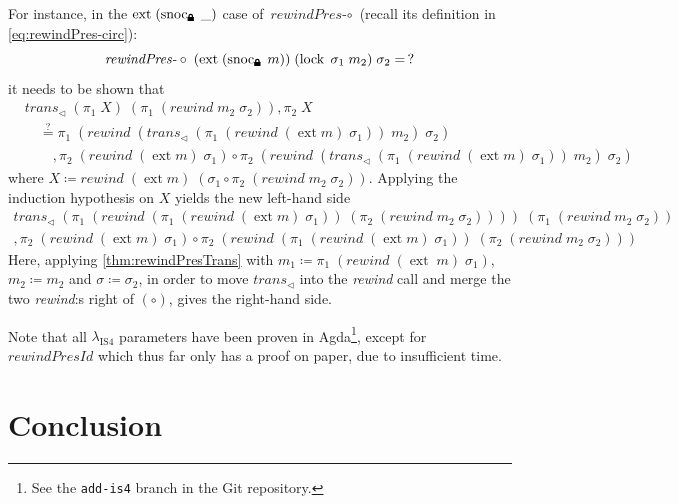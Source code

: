 \documentclass[12pt,twoside,openright]{report}
\numberwithin{equation}{chapter}
\numberwithin{figure}{chapter}
\numberwithin{table}{chapter}
\theoremstyle{definition}\newtheorem{definition}{Definition}
\newcommand{\lock}{\text{\tikz[baseline]{
      \fill[rounded corners=.1ex] (-.75ex,0) rectangle (.75ex,1ex);
      \draw[line width=.3ex] (-.4ex,.5ex) -- ++(0,.75ex) arc (180:0:.4ex) -- ++(0,-.75ex);
}}}
\begin{document}
For instance, in the $\operatorname{ext} \; (\operatorname{snoc}_\lock \; \_)$ case of $\textit{rewindPres-}\circ$
(recall its definition in \autoref{eq:rewindPres-circ}):
$$ \textit{rewindPres-}\circ \; (\operatorname{ext} \; (\operatorname{snoc}_\lock \; m)) \; (\operatorname{lock} \; \sigma_1 \; m_2) \; \sigma_2 = \, ? $$
it needs to be shown that
\begin{align*}
  &\textit{trans}_\lhd \; (\pi_1 \; X) \; (\pi_1 \; (\textit{rewind} \; m_2 \; \sigma_2)) , \pi_2 \; X \\
  &\quad \stackrel?= \pi_1 \; (\textit{rewind} \; (\textit{trans}_\lhd \; (\pi_1 \; (\textit{rewind} \; (\operatorname{ext} m) \; \sigma_1)) \; m_2) \; \sigma_2) \\
  &\qquad , \pi_2 \; (\textit{rewind} \; (\operatorname{ext} m) \; \sigma_1) \circ \pi_2 \; (\textit{rewind} \; (\textit{trans}_\lhd \; (\pi_1 \; (\textit{rewind} \; (\operatorname{ext} m) \; \sigma_1)) \; m_2) \; \sigma_2)
\end{align*}
where $X \coloneqq \textit{rewind} \; (\operatorname{ext} m) \; (\sigma_1 \circ \pi_2 \; (\textit{rewind} \; m_2 \; \sigma_2))$.
Applying the induction hypothesis on $X$ yields the new left-hand side
\begin{multline*}
  \textit{trans}_\lhd \; (\pi_1 \; (\textit{rewind} \; (\pi_1 \; (\textit{rewind} \; (\operatorname{ext} m) \; \sigma_1)) \; (\pi_2 \; (\textit{rewind} \; m_2 \; \sigma_2)))) \; (\pi_1 \; (\textit{rewind} \; m_2 \; \sigma_2)) \\
  , \pi_2 \; (\textit{rewind} \; (\operatorname{ext} m) \; \sigma_1) \circ \pi_2 \; (\textit{rewind} \; (\pi_1 \; (\textit{rewind} \; (\operatorname{ext} m) \; \sigma_1)) \; (\pi_2 \; (\textit{rewind} \; m_2 \; \sigma_2)))
\end{multline*}
Here, applying \autoref{thm:rewindPresTrans} with
$m_1 \coloneqq \pi_1 \; (\textit{rewind} \; (\operatorname{ext} \; m) \; \sigma_1)$,
$m_2 \coloneqq m_2$ and $\sigma \coloneqq \sigma_2$,
in order to move $\textit{trans}_\lhd$ into the \textit{rewind} call
and merge the two \textit{rewind}:s right of $(\circ)$,
gives the right-hand side.

Note that all $\lambda_\text{IS4}$ parameters have been proven in Agda\footnote{
See the \texttt{add-is4} branch in the Git repository.},
except for $\textit{rewindPresId}$ which thus far only has a proof on paper,
due to insufficient time.

\chapter{Conclusion}\label{sec:conclusion}
\end{document}

